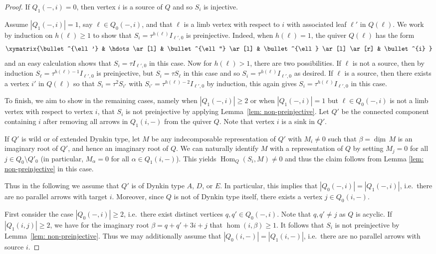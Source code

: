 \documentclass{amsart}
\numberwithin{equation}{section}
\newcommand\udim{{\underline{\dim}\, }}
\newcommand{\Hom}{\operatorname{Hom}}
\begin{document}
\begin{proof}
  If $Q_1(-,i)=0$, then vertex $i$ is a source of $Q$ and so $S_i$ is injective.

  Assume $|Q_1(-,i)|=1$, say $\ell\in Q_0(-,i)$, and that $\ell$ is a limb vertex with respect to $i$ with associated leaf $\ell'$ in $Q(\ell)$.
  We work by induction on $h(\ell)\ge1$ to show that $S_i=\tau^{h(\ell)}I_{\ell',0}$ is preinjective.
  Indeed, when $h(\ell)=1$, the quiver $Q(\ell)$ has the form
  \[\xymatrix{\bullet^{\ell'} & \hdots \ar[l] & \bullet^{\ell''} \ar[l] & \bullet^{\ell} \ar[l] \ar[r] & \bullet^{i} }\]
  and an easy calculation shows that $S_i=\tau I_{\ell',0}$ in this case.
  Now for $h(\ell)>1$, there are two possibilities.
  If $\ell$ is not a source, then by induction $S_\ell=\tau^{h(\ell)-1}I_{\ell',0}$ is preinjective, but $S_i=\tau S_\ell$ in this case and so $S_i=\tau^{h(\ell)}I_{\ell',0}$ as desired.
  If $\ell$ is a source, then there exists a vertex $i'$ in $Q(\ell)$ so that $S_i=\tau^2 S_{i'}$ with $S_{i'}=\tau^{h(\ell)-2} I_{\ell',0}$ by induction, this again gives $S_i=\tau^{h(\ell)} I_{\ell',0}$ in this case.

  To finish, we aim to show in the remaining cases, namely when $|Q_1(-,i)|\ge2$ or when $|Q_1(-,i)|=1$ but $\ell\in Q_0(-,i)$ is not a limb vertex with respect to vertex $i$, that $S_i$ is not preinjective by applying Lemma~\ref{lem: non-preinjective}. 
  Let $Q'$ be the connected component containing $i$ after removing all arrows in $Q_1(i,-)$ from the quiver $Q$.
  Note that vertex $i$ is a sink in $Q'$.

  If $Q'$ is wild or of extended Dynkin type, let $M$ be any indecomposable representation of $Q'$ with $M_i\neq 0$ such that $\beta=\udim M$ is an imaginary root of $Q'$, and hence an imaginary root of $Q$. 
  We can naturally identify $M$ with a representation of $Q$ by setting $M_j=0$ for all $j\in Q_0\setminus Q'_0$ (in particular, $M_\alpha=0$ for all $\alpha\in Q_1(i,-)$).
  This yields $\Hom_Q(S_i,M)\neq 0$ and thus the claim follows from Lemma \ref{lem: non-preinjective} in this case. 

  Thus in the following we assume that $Q'$ is of Dynkin type $A$, $D$, or $E$.
  In particular, this implies that $|Q_0(-,i)|=|Q_1(-,i)|$, i.e.~there are no parallel arrows with target $i$.
  Moreover, since $Q$ is not of Dynkin type itself, there exists a vertex $j\in Q_0(i,-)$.  
	
  First consider the case $|Q_0(-,i)|\geq 2$, i.e.~there exist distinct vertices $q,q'\in Q_0(-,i)$.
  Note that $q,q'\neq j$ as $Q$ is acyclic. 
  If $|Q_1(i,j)|\geq 2$, we have for the imaginary root $\beta=q+q'+3i+j$ that $\hom(i,\beta)\geq 1$.
  It follows that $S_i$ is not preinjective by Lemma~\ref{lem: non-preinjective}.
  Thus we may additionally assume that $|Q_0(i,-)|=|Q_1(i,-)|$, i.e.~there are no parallel arrows with source $i$.


\end{proof}
\end{document}
